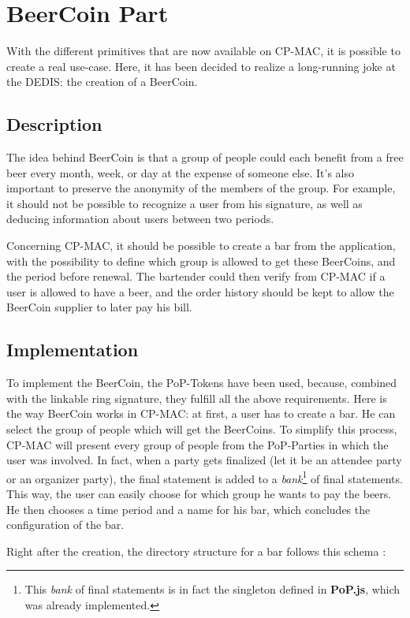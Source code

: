 \section{BeerCoin Part}
\label{sec:beercoin}
With the different primitives that are now available on CP-MAC, it is possible to create a real use-case. Here, it has been decided to realize a long-running joke at the DEDIS: the creation of a BeerCoin.

\subsection{Description}
The idea behind BeerCoin is that a group of people could each benefit from a free beer every month, week, or day at the expense of someone else. It's also important to preserve the anonymity of the members of the group. For example, it should not be possible to recognize a user from his signature, as well as deducing information about users between two periods. 

Concerning CP-MAC, it should be possible to create a bar from the application, with the possibility to define which group is allowed to get these BeerCoins, and the period before renewal. The bartender could then verify from CP-MAC if a user is allowed to have a beer, and the order history should be kept to allow the BeerCoin supplier to later pay his bill.

\subsection{Implementation}
To implement the BeerCoin, the PoP-Tokens have been used, because, combined with the linkable ring signature, they fulfill all the above require\-ments. Here is the way BeerCoin works in CP-MAC: at first, a user has to create a bar. He can select the group of people which will get the BeerCoins. To simplify this process, CP-MAC will present every group of people from the PoP-Parties in which the user was involved. In fact, when a party gets finalized (let it be an attendee party or an organizer party), the final statement is added to a \textit{bank}\footnote{This \textit{bank} of final statements is in fact the singleton defined in \textbf{PoP.js}, which was already implemented.} of final statements. This way, the user can easily choose for which group he wants to pay the beers. He then chooses a time period and a name for his bar, which concludes the configuration of the bar.

Right after the creation, the directory structure for a bar follows this schema :

